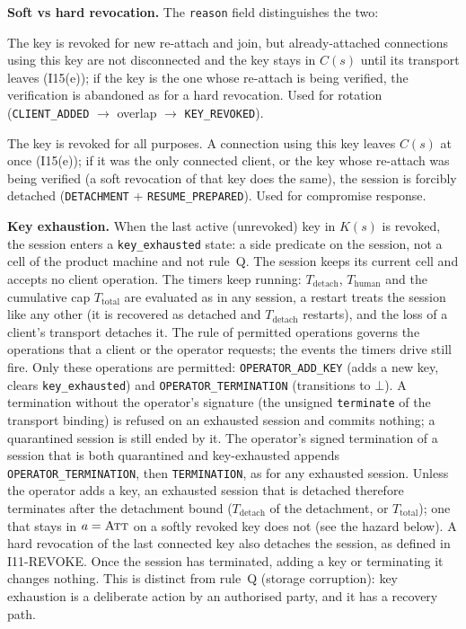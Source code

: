 \textbf{Soft vs hard revocation.} The \texttt{reason} field
distinguishes the two:
\begin{description}[leftmargin=2em]
\item[\texttt{rotation} (soft).] The key is revoked for new
re-attach and join, but already-attached connections using this key are
not disconnected and the key stays in $C(s)$ until its transport leaves
(I15(e)); if the key is the one whose re-attach is being verified, the
verification is abandoned as for a hard revocation. Used for rotation (\texttt{CLIENT\_ADDED} $\to$
overlap $\to$ \texttt{KEY\_REVOKED}).
\item[\texttt{compromise} (hard).] The key is revoked for all
purposes. A connection using this key leaves $C(s)$ at once (I15(e)); if
it was the only connected client, or the key whose re-attach was being
verified (a soft revocation of that key does the same), the session is forcibly detached (\texttt{DETACHMENT} +
\texttt{RESUME\_PREPARED}). Used for compromise response.
\end{description}

\textbf{Key exhaustion.} When the last active (unrevoked) key in $K(s)$ is
revoked, the session enters a \texttt{key\_exhausted} state: a side
predicate on the session, not a cell of the product machine and not
rule~Q. The session keeps its current cell and accepts no client
operation. The timers keep running: $T_{\text{detach}}$,
$T_{\text{human}}$ and the cumulative cap $T_{\text{total}}$ are
evaluated as in any session, a restart treats the session like any other
(it is recovered as detached and $T_{\text{detach}}$ restarts), and the
loss of a client's transport detaches it. The rule of permitted operations
governs the operations that a client or the operator requests; the events the
timers drive still fire. Only these operations are permitted: \texttt{OPERATOR\_ADD\_KEY} (adds a new key, clears
\texttt{key\_exhausted}) and \texttt{OPERATOR\_TERMINATION}
(transitions to $\bot$). A termination without the operator's signature
(the unsigned \texttt{terminate} of the transport binding) is refused on an
exhausted session and commits nothing; a quarantined session is still ended
by it. The operator's signed termination of a session that is both
quarantined and key-exhausted appends \texttt{OPERATOR\_TERMINATION}, then
\texttt{TERMINATION}, as for any exhausted session. Unless the operator adds a key, an exhausted
session that is detached therefore terminates after the detachment bound
($T_{\text{detach}}$ of the detachment, or $T_{\text{total}}$); one that
stays in $a=\textsc{Att}$ on a softly revoked key does not (see the hazard
below). A hard revocation of the last connected key also detaches the
session, as defined in I11-REVOKE. Once
the session has terminated, adding a key or terminating it changes
nothing. This is distinct from rule~Q (storage
corruption): key exhaustion is a deliberate action by an authorised
party, and it has a recovery path.

